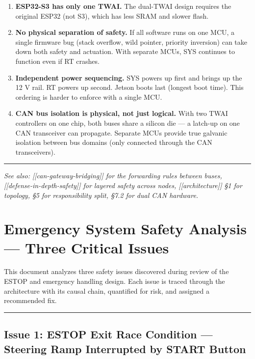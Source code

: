 \documentclass[12pt,a4paper,oneside]{report}
\providecommand{\tightlist}{\setlength{\itemsep}{0pt}\setlength{\parskip}{0pt}}
\begin{document}
\begin{enumerate}
\def\labelenumi{\arabic{enumi}.}
\tightlist
\item
  \textbf{ESP32-S3 has only one TWAI.} The dual-TWAI design requires the
  original ESP32 (not S3), which has less SRAM and slower flash.
\item
  \textbf{No physical separation of safety.} If all software runs on one MCU, a
  single firmware bug (stack overflow, wild pointer, priority inversion) can
  take down both safety and actuation. With separate MCUs, SYS continues to
  function even if RT crashes.
\item
  \textbf{Independent power sequencing.} SYS powers up first and brings up the
  12 V rail. RT powers up second. Jetson boots last (longest boot time). This
  ordering is harder to enforce with a single MCU.
\item
  \textbf{CAN bus isolation is physical, not just logical.} With two TWAI
  controllers on one chip, both buses share a silicon die --- a latch-up on one
  CAN transceiver can propagate. Separate MCUs provide true galvanic isolation
  between bus domains (only connected through the CAN transceivers).
\end{enumerate}

\begin{center}\rule{0.5\linewidth}{0.5pt}\end{center}

\emph{See also: {[}{[}can-gateway-bridging{]}{]} for the forwarding rules
between buses, {[}{[}defense-in-depth-safety{]}{]} for layered safety across
nodes, {[}{[}architecture{]}{]} §1 for topology, §5 for responsibility split,
§7.2 for dual CAN hardware.}


\chapter{Emergency System Safety Analysis --- Three Critical
Issues}\label{emergency-system-safety-analysis-three-critical-issues}

This document analyzes three safety issues discovered during review of the ESTOP
and emergency handling design. Each issue is traced through the architecture
with its causal chain, quantified for risk, and assigned a recommended fix.

\begin{center}\rule{0.5\linewidth}{0.5pt}\end{center}

\section{Issue 1: ESTOP Exit Race Condition --- Steering Ramp Interrupted by
START
Button}\label{issue-1-estop-exit-race-condition-steering-ramp-interrupted-by-start-button}
\end{document}
